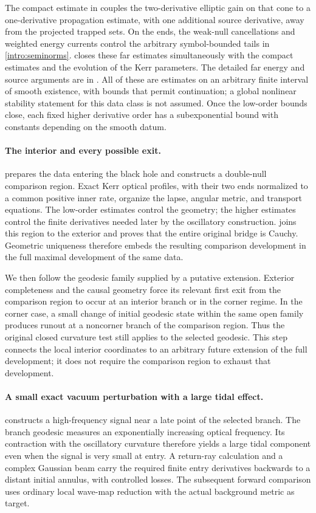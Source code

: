 The compact estimate in  couples the two-derivative
elliptic gain on that cone to a one-derivative propagation estimate,
with one additional source derivative, away from the projected trapped
sets. On the ends, the weak-null cancellations and weighted energy
currents control the arbitrary symbol-bounded tails in
\eqref{intro:seminorms}.  closes these far estimates
simultaneously with the compact estimates and the evolution of the
Kerr parameters. The detailed far energy and source arguments are in
. All of these are estimates on an arbitrary
finite interval of smooth existence, with bounds that permit
continuation; a global nonlinear stability statement for this data
class is not assumed. Once the low-order bounds close, each fixed
higher derivative order has a subexponential bound with constants
depending on the smooth datum.

\paragraph{The interior and every possible exit.}
 prepares the data entering the black hole and
constructs a double-null comparison region. Exact Kerr optical
profiles, with their two ends normalized to a common positive inner
rate, organize the lapse, angular metric, and transport equations.
The low-order estimates control the geometry; the higher estimates
control the finite derivatives needed later by the oscillatory
construction.  joins this region to the exterior
and proves that the entire original bridge is Cauchy. Geometric
uniqueness therefore embeds the resulting comparison development in
the full maximal development of the same data.

We then follow the geodesic family supplied by a putative extension.
Exterior completeness and the causal geometry force its relevant
first exit from the comparison region to occur at an interior branch
or in the corner regime. In the corner case, a small
change of initial geodesic state within the same open family produces
runout at a noncorner branch of the comparison region. Thus the original
closed curvature test still applies
to the selected geodesic. This step connects the local interior
coordinates to an arbitrary future extension of the full development;
it does not require the comparison region to exhaust that development.

\paragraph{A small exact vacuum perturbation with a large tidal effect.}
 constructs a high-frequency signal near a late point
of the selected branch. The branch geodesic measures an exponentially
increasing optical frequency. Its contraction with the oscillatory
curvature therefore yields a large tidal component even when the
signal is very small at entry. A return-ray calculation and a complex
Gaussian beam carry the required finite entry derivatives backwards
to a distant initial annulus, with controlled losses. The subsequent
forward comparison uses ordinary local wave-map reduction with the
actual background metric as target.

